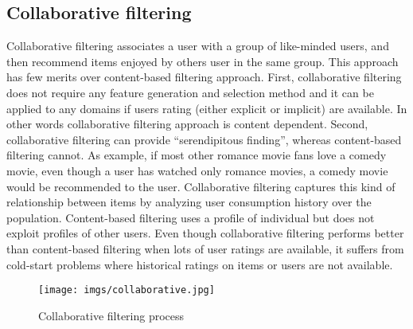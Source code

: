 \documentclass[document.tex]{subfiles}
\begin{document}
\subsection{Collaborative filtering}
Collaborative filtering associates a user with a group of like-minded users, and then recommend items enjoyed by others user in the same group. This approach has few merits over content-based filtering approach. First, collaborative filtering does not require any feature generation and selection method and it can be applied to any domains if users rating (either explicit or implicit) are available. In other words collaborative filtering approach is content dependent. Second, collaborative filtering can provide “serendipitous finding”, whereas content-based filtering cannot. As example, if most other romance movie fans love a comedy movie, even though a user has watched only romance movies, a comedy movie would be recommended to the user. Collaborative filtering captures this kind of relationship between items by analyzing user consumption history over the population. Content-based filtering uses a profile of individual but does not exploit profiles of other users. Even though collaborative filtering performs better than content-based filtering when lots of user ratings are available, it suffers from cold-start problems where historical ratings on items or users are not available.
\begin{figure}[H]
	\centering
	\texttt{[image: imgs/collaborative.jpg]}
	\caption[Collaborative filtering process]
	{Collaborative filtering process}
\end{figure}
\end{document}
